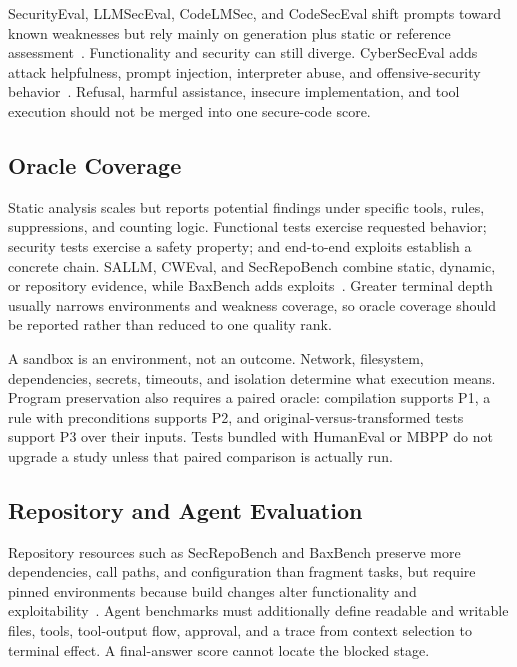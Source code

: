 \documentclass[acmsmall,screen,review]{acmart}
\begin{document}
SecurityEval, LLMSecEval, CodeLMSec, and CodeSecEval shift prompts toward known weaknesses but rely mainly on generation plus static or reference assessment~\cite{siddiq2022securityeval,tony2023llmseval,hajipour2024codelmsec,codeseceval2024}. Functionality and security can still diverge. CyberSecEval adds attack helpfulness, prompt injection, interpreter abuse, and offensive-security behavior~\cite{bhatt2023cyberseceval,cyberseceval2,cyberseceval3}. Refusal, harmful assistance, insecure implementation, and tool execution should not be merged into one secure-code score.

\subsection{Oracle Coverage}
Static analysis scales but reports potential findings under specific tools, rules, suppressions, and counting logic. Functional tests exercise requested behavior; security tests exercise a safety property; and end-to-end exploits establish a concrete chain. SALLM, CWEval, and SecRepoBench combine static, dynamic, or repository evidence, while BaxBench adds exploits~\cite{siddiq2024sallm,cweval2025,secrepobench2025,baxbench2025}. Greater terminal depth usually narrows environments and weakness coverage, so oracle coverage should be reported rather than reduced to one quality rank.

A sandbox is an environment, not an outcome. Network, filesystem, dependencies, secrets, timeouts, and isolation determine what execution means. Program preservation also requires a paired oracle: compilation supports P1, a rule with preconditions supports P2, and original-versus-transformed tests support P3 over their inputs. Tests bundled with HumanEval or MBPP do not upgrade a study unless that paired comparison is actually run.

\subsection{Repository and Agent Evaluation}
Repository resources such as SecRepoBench and BaxBench preserve more dependencies, call paths, and configuration than fragment tasks, but require pinned environments because build changes alter functionality and exploitability~\cite{secrepobench2025,baxbench2025}. Agent benchmarks must additionally define readable and writable files, tools, tool-output flow, approval, and a trace from context selection to terminal effect. A final-answer score cannot locate the blocked stage.
\end{document}
